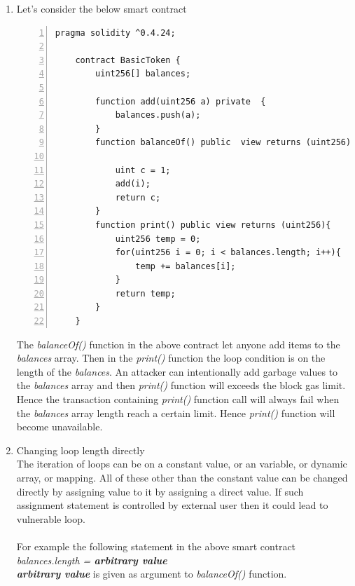 \documentclass{article}
\begin{document}
\begin{enumerate}
    \item Let's consider the below smart contract
    \begin{Verbatim}[numbers=left,xleftmargin=5mm]
    pragma solidity ^0.4.24;
    
    contract BasicToken {
        uint256[] balances;
        
        function add(uint256 a) private  {
            balances.push(a);
        }
        function balanceOf() public  view returns (uint256) {
        
            uint c = 1;
            add(i);
            return c;
        }
        function print() public view returns (uint256){
            uint256 temp = 0;
            for(uint256 i = 0; i < balances.length; i++){
                temp += balances[i];
            }
            return temp;
        }
    }
    \end{Verbatim}
    
    The \emph{balanceOf()} function in the above contract let anyone add items to the \emph{balances} array. Then in the \emph{print()} function the loop condition is on the length of the \emph{balances}. An attacker can intentionally add garbage values to the \emph{balances} array and then \emph{print()} function will exceeds the block gas limit. Hence the transaction containing \emph{print()} function call will always fail when the \emph{balances} array length reach a certain limit. Hence \emph{print()} function will become unavailable. 
    \item Changing loop length directly\\
    The iteration of loops can be on a constant value, or an variable, or dynamic array, or mapping. All of these other than the constant value can be changed directly by assigning value to it by assigning a direct value. If such assignment statement is controlled by external user then it could lead to vulnerable loop.\\
    \\
    For example the following statement in the above smart contract\\
    \emph{balances.length = \textbf{arbitrary value}}\\
    \emph{\textbf{arbitrary value}} is given as argument to \emph{balanceOf()} function.\\
    
    
\end{enumerate}
\end{document}

